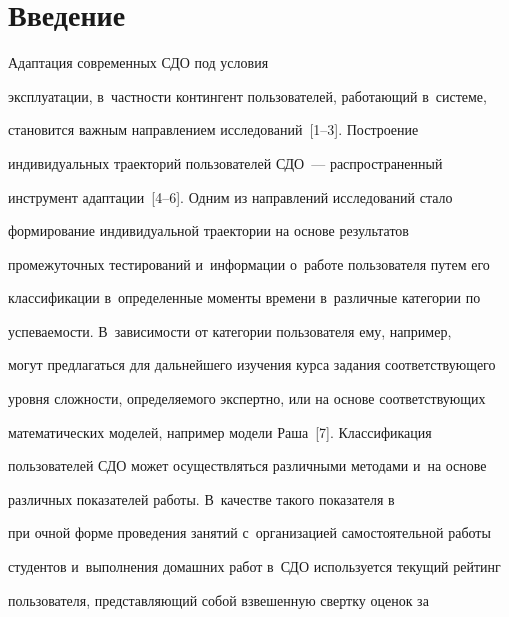 




 \thispagestyle{headings}


 


 \vspace*{-18pt}





\section{Введение}





     Адаптация современных СДО под условия 


эксплуатации, в~част\-ности контингент пользователей, работающий в~системе, 


становится важным на\-прав\-ле\-ни\-ем исследований~[1--3]. Построение 


индивидуальных траекторий пользователей СДО~--- распространенный 


инструмент адаптации~[4--6]. Одним из направлений исследований стало 


формирование индивидуальной траектории на основе результатов 


промежуточных тестирований и~информации о~работе пользователя путем его 


классификации в~определенные моменты времени в~различные категории по 


успеваемости. В~за\-ви\-си\-мости от категории пользователя ему, например, 


могут предлагаться для дальнейшего изучения курса задания соответствующего 


уровня сложности, определяемого экспертно, или на основе соответствующих 


математических моделей, например модели Раша~[7]. Классификация 


пользователей СДО может осуществляться различными методами и~на основе 


различных показателей работы. В~качестве такого показателя в~\cite{4-nau} 


при очной форме проведения занятий с~организацией самостоятельной работы 


студентов и~выполнения домашних работ в~СДО используется текущий рейтинг 


пользователя, представляющий собой взвешенную свертку оценок за 


